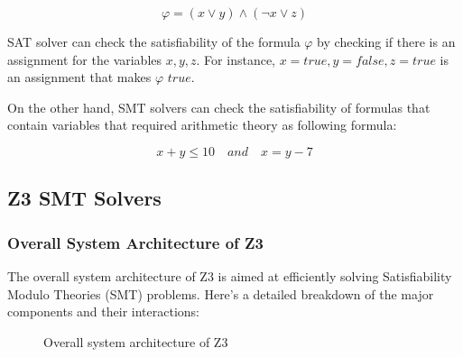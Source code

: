 \documentclass[]{rptuseminar}
\begin{document}
\begin{equation}
  \varphi = (x \lor y) \land (\lnot x \lor z)
\end{equation}

SAT solver can check the satisfiability of the formula \(\varphi\) by checking if there is an assignment for the variables \(x, y, z\).
For instance, \(x = true, y = false, z = true\) is an assignment that makes \(\varphi\) \(true\). 

On the other hand, SMT solvers can check the satisfiability of formulas that contain variables that required arithmetic theory as following formula:

\begin{equation}
  x + y \leq 10 \quad and \quad x = y - 7
\end{equation}

\subsection{Z3 SMT Solvers}
\subsubsection*{Overall System Architecture of Z3}
The overall system architecture of Z3 is aimed at eﬃciently solving Satisfiability Modulo Theories (SMT) problems. Here's a detailed breakdown of the major components and their interactions:

 \begin{figure}[ht]
  \begin{center}
  \end{center}
  \caption{%
     Overall system architecture of Z3
    \cite{nikolaj_bjorner_programming_nodate}
  }
  \label{fig:scholar} %
\end{figure}
\end{document}
